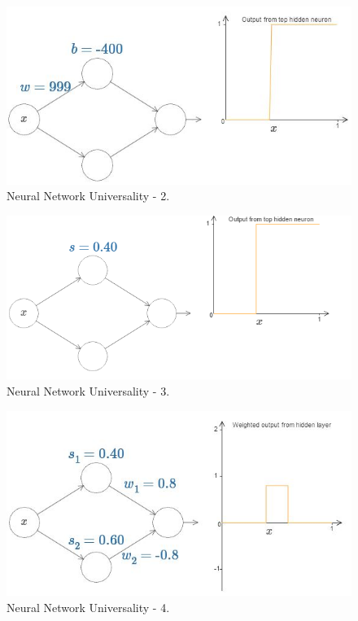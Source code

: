 \documentclass[]{book}
\begin{document}
\begin{figure}

{\centering \includegraphics[width=0.75\linewidth]{fig/04_tikz42} 

}

\caption{Neural Network Universality - 2.}\label{fig:vsnn-nnup-02}
\end{figure}

\begin{figure}

{\centering \includegraphics[width=0.75\linewidth]{fig/04_tikz43} 

}

\caption{Neural Network Universality - 3.}\label{fig:vsnn-nnup-03}
\end{figure}

\begin{figure}

{\centering \includegraphics[width=0.75\linewidth]{fig/04_tikz44} 

}

\caption{Neural Network Universality - 4.}\label{fig:vsnn-nnup-04}
\end{figure}
\end{document}
